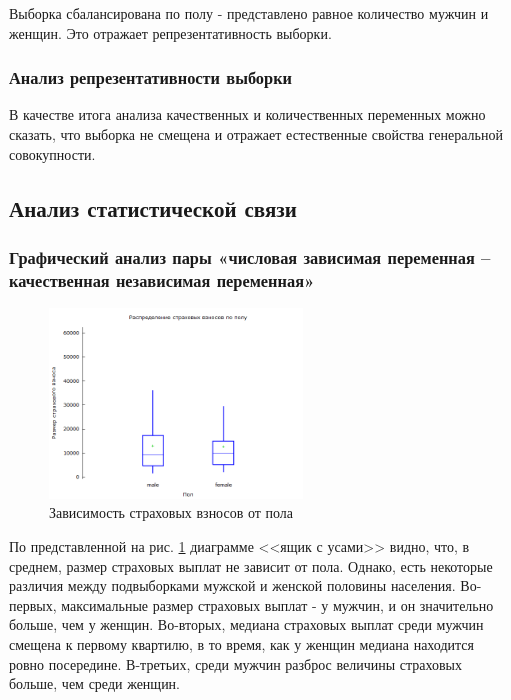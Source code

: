 \documentclass[a4paper,12pt]{article}
\begin{document}
Выборка сбалансирована по полу - представлено равное количество мужчин и женщин. Это отражает репрезентативность выборки.

\subsubsection{Анализ репрезентативности выборки}

В качестве итога анализа качественных и количественных переменных можно сказать, что выборка не смещена и отражает естественные свойства генеральной совокупности.

\subsection{Анализ статистической связи}

\subsubsection{Графический анализ пары «числовая зависимая переменная – качественная независимая переменная»}

\begin{figure}[H]
	\includegraphics[width=0.6\textwidth]{../[graphics]/charges-sex.png}
	\centering
	\caption{Зависимость страховых взносов от пола}
	\label{fig:charges-sex}
\end{figure}

По представленной на рис. \ref{fig:charges-sex} диаграмме <<ящик с усами>> видно, что, в среднем, размер страховых выплат не зависит от пола. Однако, есть некоторые различия между подвыборками мужской и женской половины населения. Во-первых, максимальные размер страховых выплат - у мужчин, и он значительно больше, чем у женщин. Во-вторых, медиана страховых выплат среди мужчин смещена к первому квартилю, в то время, как у женщин медиана находится ровно посередине. В-третьих, среди мужчин разброс величины страховых больше, чем среди женщин.
\end{document}
